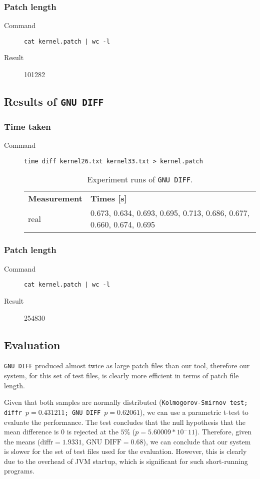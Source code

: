 \subsubsection*{Patch length}
\begin{description}
\item[Command] \texttt{cat kernel.patch | wc -l}
\item[Result] 101282
\end{description}
  
\subsection{Results of \texttt{GNU DIFF} }
\subsubsection*{Time taken}
\begin{description}
\item[Command] \texttt{time diff kernel26.txt kernel33.txt > kernel.patch}
\begin{table}[htbp]
\begin{center}
\begin{tabular}{ l p{3in} }
\textbf{Measurement} & \textbf{Times [s]} \\
\cmidrule(r){1-2}
real & 0.673, 0.634, 0.693, 0.695, 0.713, 0.686, 0.677, 0.660, 0.674, 0.695 \\
\end{tabular}
\end{center}
\caption{Experiment runs of \texttt{GNU DIFF}.}
\end{table}

\end{description}

\subsubsection*{Patch length}
\begin{description}
\item[Command] \texttt{cat kernel.patch | wc -l}
\item[Result] 254830
\end{description}

\subsection{Evaluation}
\texttt{GNU DIFF} produced almost twice as large patch files than our tool, therefore our system, for this set of test files, is clearly more efficient in terms of patch file length. 

Given that both samples are normally distributed (\texttt{Kolmogorov-Smirnov test; \texttt{diffr} $p=0.431211$; \texttt{GNU DIFF} $p=0.62061$}), we can use a parametric t-test to evaluate the performance. The test concludes that the null hypothesis that the mean difference is $0$ is rejected at the $5\%$ ($p=5.60009*10^-11$). Therefore, given the means ($\mbox{diffr} = 1.9331$, $\mbox{GNU DIFF}=0.68$), we can conclude that our system is slower for the set of test files used for the evaluation. However, this is clearly due to the overhead of JVM startup, which is significant for such short-running programs.
